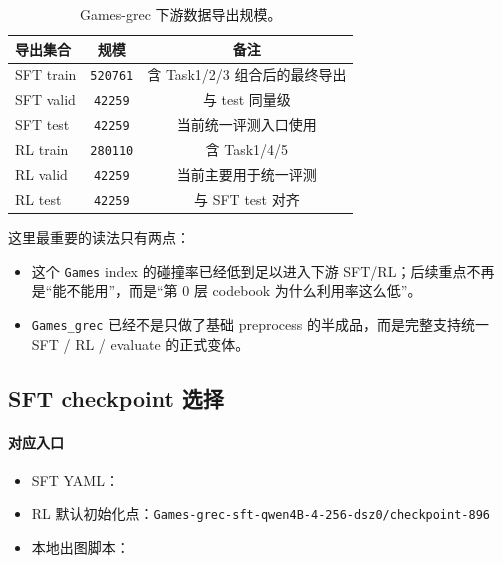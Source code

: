 \begin{table}[H]
\centering
\small
\setlength{\tabcolsep}{4pt}
\begin{tabular}{p{3.2cm} c c}
\toprule
导出集合 & 规模 & 备注 \\
\midrule
SFT train & \texttt{520761} & 含 Task1/2/3 组合后的最终导出 \\
SFT valid & \texttt{42259} & 与 test 同量级 \\
SFT test & \texttt{42259} & 当前统一评测入口使用 \\
RL train & \texttt{280110} & 含 Task1/4/5 \\
RL valid & \texttt{42259} & 当前主要用于统一评测 \\
RL test & \texttt{42259} & 与 SFT test 对齐 \\
\bottomrule
\end{tabular}
\caption{Games-grec 下游数据导出规模。}
\end{table}

这里最重要的读法只有两点：

\begin{itemize}
\item 这个 \texttt{Games} index 的碰撞率已经低到足以进入下游 SFT/RL；后续重点不再是“能不能用”，而是“第 0 层 codebook 为什么利用率这么低”。
\item \texttt{Games\_grec} 已经不是只做了基础 preprocess 的半成品，而是完整支持统一 SFT / RL / evaluate 的正式变体。
\end{itemize}

\subsection{SFT checkpoint 选择}

\paragraph{对应入口}
{\footnotesize
\begin{itemize}
\item SFT YAML：
\item RL 默认初始化点：\texttt{Games-grec-sft-qwen4B-4-256-dsz0/checkpoint-896}
\item 本地出图脚本：
\end{itemize}
}

